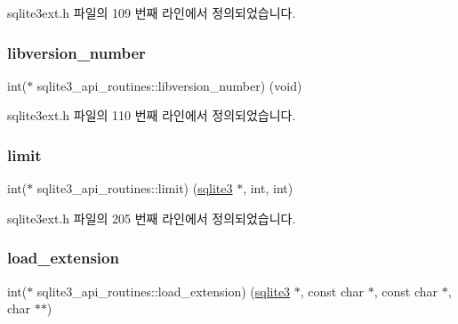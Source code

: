 sqlite3ext.\+h 파일의 109 번째 라인에서 정의되었습니다.

\mbox{\label{structsqlite3__api__routines_ad33f785fe5f26b534a570c9055a34858}} 
\subsubsection{\texorpdfstring{libversion\+\_\+number}{libversion\_number}}
{\footnotesize\ttfamily int($\ast$ sqlite3\+\_\+api\+\_\+routines\+::libversion\+\_\+number) (void)}



sqlite3ext.\+h 파일의 110 번째 라인에서 정의되었습니다.

\mbox{\label{structsqlite3__api__routines_a05f3f0b267ba34ede22140d89d86f61b}} 
\subsubsection{\texorpdfstring{limit}{limit}}
{\footnotesize\ttfamily int($\ast$ sqlite3\+\_\+api\+\_\+routines\+::limit) (\hyperlink{sqlite3_8h_a0ef6f2646262c8a9b24368d8ac140f69}{sqlite3} $\ast$, int, int)}



sqlite3ext.\+h 파일의 205 번째 라인에서 정의되었습니다.

\mbox{\label{structsqlite3__api__routines_a33eef15b418c498b26cd052daf668f01}} 
\subsubsection{\texorpdfstring{load\+\_\+extension}{load\_extension}}
{\footnotesize\ttfamily int($\ast$ sqlite3\+\_\+api\+\_\+routines\+::load\+\_\+extension) (\hyperlink{sqlite3_8h_a0ef6f2646262c8a9b24368d8ac140f69}{sqlite3} $\ast$, const char $\ast$, const char $\ast$, char $\ast$$\ast$)}



